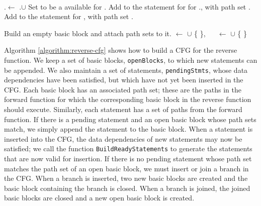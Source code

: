 \documentclass[12pt]{gatech-thesis}
\begin{document}
\begin{algorithm}
\BlankLine


\GetStatements{\valNode, \availablePathSets, \stmts}\\
\Begin
{
	\valNode.\cond $\leftarrow$ \valNode.\cond $\cup$ \availablePathSets \;
	\ForEach{\edge $\in$  \InEdges{\valNode}}
	{
		{
			{
				Set \edge to be a available for \edge.\source \;
				{
					Add to \stmts the statement for for \edge.\source, with path set \edge.\cond \;
				}
			}
		\Else
		{
			Add to \stmts the statement for \edge, with path set \edge.\cond \;
		}}
	}
}
\BlankLine

\BuildBB{\cond}
\Begin
{
	Build an empty basic block \bb and attach path sets \cond to it. \;
	\CFG $\leftarrow$ \CFG $\cup$ \{ \bb \}, $\quad$
	\bbs $\leftarrow$ \bbs $\cup$ \{ \bb \} \;
	\Return{ \bb } \;
}

\end{algorithm}

Algorithm \ref{algorithm:reverse-cfg} shows how to build a CFG for the reverse function. 
We keep a set of basic blocks, \texttt{openBlocks}, to which new statements can be appended.  
We also maintain a set of statements, \texttt{pendingStmts}, whose data dependencies have been satisfied, but which have not yet been inserted in the CFG.
Each basic block has an associated path set; these are the paths in the forward function for which the corresponding basic block in the reverse function should execute.
Similarly, each statement has a set of paths from the forward function. 
If there is a pending statement and an open basic block whose path sets match, we simply append the statement to the basic block.
When a statement is inserted into the CFG, the data dependencies of new statements may now be satisfied; we call the function \texttt{BuildReadyStatements} to generate the statements that are now valid for insertion. 
If there is no pending statement whose path set matches the path set of an open basic block, we must insert or join a branch in the CFG.
When a branch is inserted, two new basic blocks are created and the basic block containing the branch is closed. 
When a branch is joined, the joined basic blocks are closed and a new open basic block is created.
\end{document}
